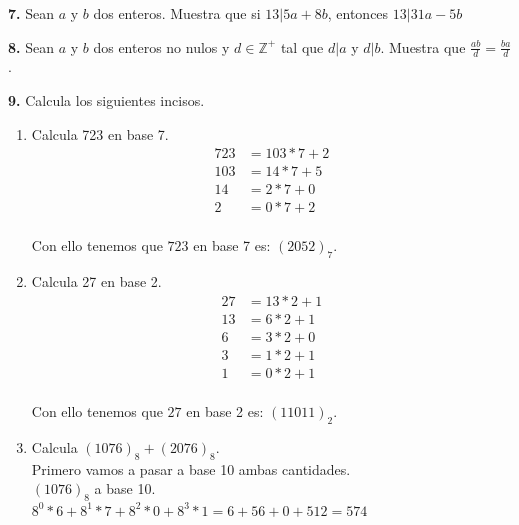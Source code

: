 \documentclass[12pt]{article}
\begin{document}
%
%
\textbf{7.} Sean $a$ y $b$ dos enteros. Muestra que si $13 | 5a + 8b$, entonces $13|31a - 5b$\\

\vspace{1cm}

%
%
\textbf{8.} Sean $a$ y $b$ dos enteros no nulos y $d \in \mathbb{Z}^+$ tal que $d | a$ y $d | b$. Muestra que $\frac{ab}{d} = \frac{ba}{d}$.

\vspace{1cm}

%
%
\textbf{9.} Calcula los siguientes incisos.
\begin{enumerate}[label=\alph*)]
    \item Calcula 723 en base 7.
        \begin{align*}    
            723 &= 103 \ast 7 + 2\\
            103& = 14 \ast 7 + 5\\
            14 &= 2 \ast 7 + 0\\
            2 &= 0 \ast 7 + 2\\
        \end{align*}

        Con ello tenemos que $723$ en base 7 es: $(2052)_7$.

    \item Calcula 27 en base 2.
        \begin{align*}
            27 &= 13 \ast 2 + 1\\
            13 &= 6 \ast 2 + 1\\
            6 &= 3 \ast 2 + 0\\
            3 &= 1 \ast 2 + 1\\
            1 &= 0 \ast 2 + 1\\
        \end{align*}

        Con ello tenemos que $27$ en base 2 es: $(11011)_2$.\\

    \item Calcula $(1076)_8 + (2076)_8$.\\

        Primero vamos a pasar a base 10 ambas cantidades.\\

        $(1076)_8$ a base 10.\\
        $8^0 \ast 6 + 8^1 \ast 7 + 8^2 \ast 0 + 8^3 \ast 1 = 6 + 56 + 0 + 512 = 574$\\


\end{enumerate}
\end{document}
